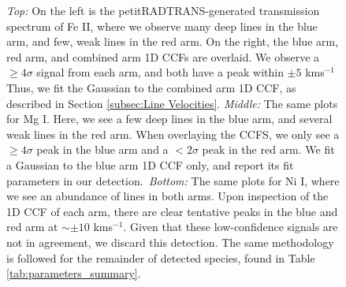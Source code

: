 \documentclass[twocolumn]{aastex631}
\begin{document}
            \begin{figure}
                \centering
                \caption{\textit{Top:} On the left is the petitRADTRANS-generated transmission spectrum of Fe II, where we observe many deep lines in the blue arm, and few, weak lines in the red arm. On the right, the blue arm, red arm, and combined arm 1D CCFs are overlaid. We observe a $\geq4\sigma$ signal from each arm, and both have a peak within $\pm5$ kms$^{-1}$ Thus, we fit the Gaussian to the combined arm 1D CCF, as described in Section \ref{subsec:Line Velocities}. \textit{Middle:} The same plots for Mg I. Here, we see a few deep lines in the blue arm, and several weak lines in the red arm. When overlaying the CCFS, we only see a $\geq4\sigma$ peak in the blue arm and a $<2\sigma$ peak in the red arm. We fit a Gaussian to the blue arm 1D CCF only, and report its fit parameters in our detection.~\textit{Bottom:} The same plots for Ni I, where we see an abundance of lines in both arms. Upon inspection of the 1D CCF of each arm, there are clear tentative peaks in the blue and red arm at $\sim\pm 10$ kms$^{-1}$. Given that these low-confidence signals are not in agreement, we discard this detection. The same methodology is followed for the remainder of detected species, found in Table \ref{tab:parameters_summary}.}
                \label{fig:detection-methodology-example}
            \end{figure}
\end{document}
